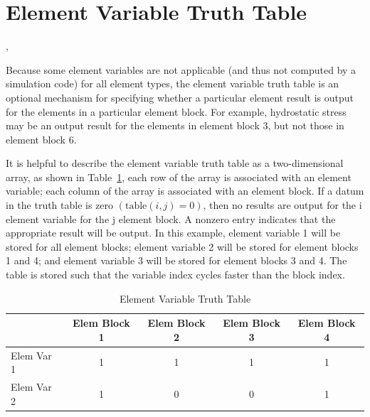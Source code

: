 \section{Element Variable Truth Table}


\begin{spacing}{1.5}
\api {}, 
\end{spacing}

Because some element variables are not applicable (and thus not
computed by a simulation code) for all element types, the element
variable truth table is an optional mechanism for specifying whether a
particular element result is output for the elements in a particular
element block. For example, hydrostatic stress may be an output result
for the elements in element block 3, but not those in element block 6.


It is helpful to describe the element variable truth table as a
two-dimensional array, as shown in Table~\ref{t:truth}, each row of
the array is associated with an element variable; each column of the
array is associated with an element block. If a datum in the truth
table is zero $(\textrm{table}(i,j)=0)$, then no results are output
for the {i}\th{} element variable for the {j}\th{} element block. A
nonzero entry indicates that the appropriate result will be output. In
this example, element variable 1 will be stored for all element
blocks; element variable 2 will be stored for element blocks 1 and 4;
and element variable 3 will be stored for element blocks 3 and 4. The
table is stored such that the variable index cycles faster than the
block index.
\begin{table}
\begin{center}
\begin{tabular}{|l|c|c|c|c|}\hline
            & Elem Block 1 & Elem Block 2 & Elem Block 3 & Elem Block 4\\ \hline\hline
Elem Var 1 & 1 & 1 & 1 & 1 \\ \hline
Elem Var 2 & 1 & 0 & 0 & 1 \\ \hline
\end{tabular}
\caption{Element Variable Truth Table}\label{t:truth}
\end{center}
\end{table}
